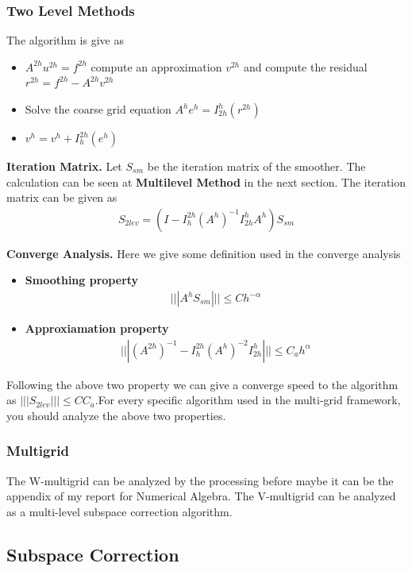 \documentclass[12pt]{amsart}
\begin{document}
\subsubsection{Two Level Methods}
The algorithm is give as
\begin{itemize}
	\item $A^{2h}u^{2h}=f^{2h}$ compute an approximation $v^{2h}$ and compute the residual $r^{2h}=f^{2h}-A^{2h}v^{2h}$
	\item Solve the coarse grid equation $A^he^h=I_{2h}^h(r^{2h})$
	\item $v^h=v^h+I_h^{2h}(e^{h})$
\end{itemize}



\textbf{Iteration Matrix.} Let $S_{sm}$ be the iteration matrix of the smoother.  The calculation can be seen at \textbf{Multilevel Method} in the next section. The iteration matrix can be given as
\begin{align*}
S_{2lev} = (I-I_{h}^{2h}(A^h)^{-1}I_{2h}^hA^h)S_{sm}
\end{align*}

\textbf{Converge Analysis.}
Here we give some definition used in the converge analysis
\begin{itemize}
	\item \textbf{Smoothing property}
	\begin{align*}
	|||A^hS_{sm}|||\le Ch^{-\alpha}
	\end{align*}
	\item \textbf{Approxiamation property}
	\begin{align*}
	|||(A^{2h})^{-1}-I_h^{2h}(A^h)^{-2}I_{2h}^h|||\le C_ah^\alpha
	\end{align*}
\end{itemize}

Following the above two property we can give a converge speed to the algorithm as $|||S_{2lev}|||\le CC_a$.For every specific algorithm used in the multi-grid framework, you should analyze the above two properties.


\subsubsection{Multigrid}

The W-multigrid can be analyzed by the processing before maybe it can be the appendix of my report for Numerical Algebra. The V-multigrid can be analyzed as a multi-level subspace correction algorithm. 

\subsection{Subspace Correction}
\end{document}
